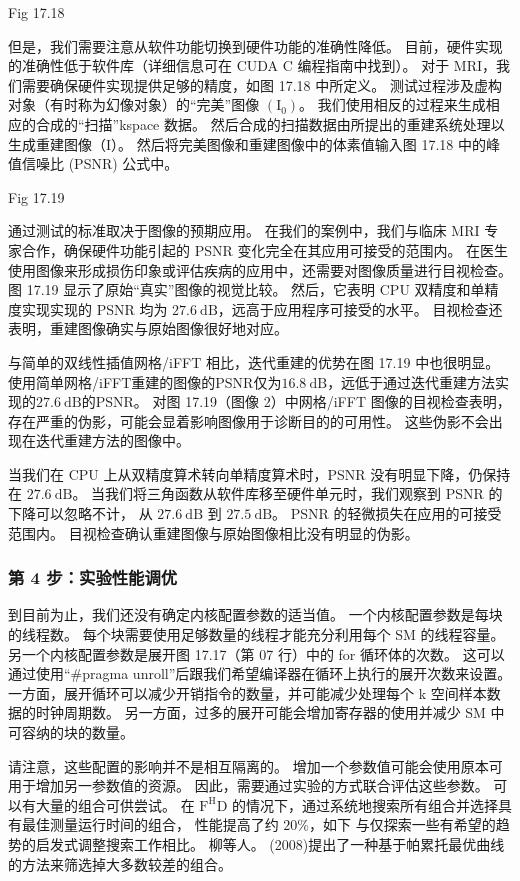 {\color{red} Fig 17.18}

但是，我们需要注意从软件功能切换到硬件功能的准确性降低。 
目前，硬件实现的准确性低于软件库（详细信息可在 CUDA C 编程指南中找到）。 
对于 MRI，我们需要确保硬件实现提供足够的精度，如图 17.18 中所定义。 
测试过程涉及虚构对象（有时称为幻像对象）的“完美”图像 $\left(\mathrm{I}_{0}\right)$。 
我们使用相反的过程来生成相应的合成的“扫描”kspace 数据。 然后合成的扫描数据由所提出的重建系统处理以生成重建图像（I）。 
然后将完美图像和重建图像中的体素值输入图 17.18 中的峰值信噪比 (PSNR) 公式中。

{\color{red} Fig 17.19}

通过测试的标准取决于图像的预期应用。 
在我们的案例中，我们与临床 MRI 专家合作，确保硬件功能引起的 PSNR 变化完全在其应用可接受的范围内。 
在医生使用图像来形成损伤印象或评估疾病的应用中，还需要对图像质量进行目视检查。 
图 17.19 显示了原始“真实”图像的视觉比较。 
然后，它表明 CPU 双精度和单精度实现实现的 PSNR 均为 $27.6 \mathrm{~dB}$，远高于应用程序可接受的水平。 
目视检查还表明，重建图像确实与原始图像很好地对应。

与简单的双线性插值网格/iFFT 相比，迭代重建的优势在图 17.19 中也很明显。 
使用简单网格/iFFT重建的图像的PSNR仅为$16.8 \mathrm{~dB}$，远低于通过迭代重建方法实现的$27.6 \mathrm{~dB}$的PSNR。 
对图 17.19（图像 2）中网格/iFFT 图像的目视检查表明，存在严重的伪影，可能会显着影响图像用于诊断目的的可用性。 
这些伪影不会出现在迭代重建方法的图像中。

当我们在 CPU 上从双精度算术转向单精度算术时，PSNR 没有明显下降，仍保持在 $27.6 \mathrm{~dB}$。 
当我们将三角函数从软件库移至硬件单元时，我们观察到 PSNR 的下降可以忽略不计，
从 $27.6 \mathrm{~dB}$ 到 $27.5 \mathrm{~dB}$。 PSNR 的轻微损失在应用的可接受范围内。 
目视检查确认重建图像与原始图像相比没有明显的伪影。

\subsubsection{第 4 步：实验性能调优}
到目前为止，我们还没有确定内核配置参数的适当值。 一个内核配置参数是每块的线程数。 
每个块需要使用足够数量的线程才能充分利用每个 SM 的线程容量。 
另一个内核配置参数是展开图 17.17（第 07 行）中的 for 循环体的次数。 
这可以通过使用“\#pragma unroll”后跟我们希望编译器在循环上执行的展开次数来设置。 
一方面，展开循环可以减少开销指令的数量，并可能减少处理每个 k 空间样本数据的时钟周期数。 
另一方面，过多的展开可能会增加寄存器的使用并减少 SM 中可容纳的块的数量。

请注意，这些配置的影响并不是相互隔离的。 增加一个参数值可能会使用原本可用于增加另一参数值的资源。 
因此，需要通过实验的方式联合评估这些参数。 可以有大量的组合可供尝试。 
在 $\mathrm{F}^{\mathrm{H}} \mathrm{D}$ 的情况下，通过系统地搜索所有组合并选择具有最佳测量运行时间的组合，
性能提高了约 $20 \%$，如下 与仅探索一些有希望的趋势的启发式调整搜索工作相比。 
柳等人。 (2008)提出了一种基于帕累托最优曲线的方法来筛选掉大多数较差的组合。

